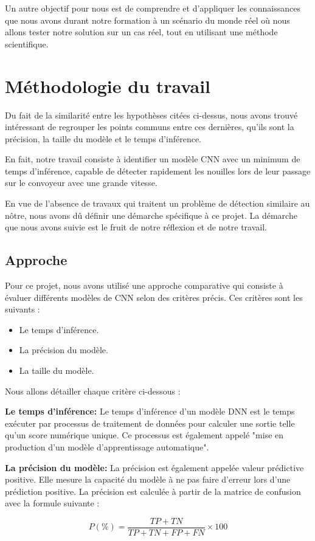 Un autre objectif pour nous est de comprendre et d'appliquer les connaissances que nous avons durant notre formation à un scénario du monde réel où nous allons tester notre solution sur un cas réel, tout en utilisant une méthode scientifique. 
\section{Méthodologie du travail}
Du fait de la similarité entre les hypothèses citées ci-dessus, nous avons trouvé intéressant de regrouper les points communs entre ces dernières, qu’ils sont la précision, la taille du modèle et le temps d’inférence. 

En fait, notre travail consiste à identifier un modèle CNN avec un minimum de temps d'inférence, capable de détecter rapidement les nouilles lors de leur passage sur le convoyeur avec une grande vitesse. 

En vue de l’absence de travaux qui traitent un problème de détection similaire au nôtre, nous avons dû définir une démarche spécifique à ce projet. La démarche que nous avons suivie est le fruit de notre réflexion et de notre travail. 
\subsection{Approche}
Pour ce projet, nous avons utilisé une approche comparative qui consiste à évaluer différents modèles de CNN selon des critères précis. Ces critères sont les suivants : 
\begin{itemize}
    \item Le temps d’inférence.
    \item La précision du modèle. 
    \item La taille du modèle. 
\end{itemize}
Nous allons détailler chaque critère ci-dessous : 

\textbf{Le temps d’inférence: }Le temps d'inférence d'un modèle DNN est le temps exécuter par processus de traitement de données pour calculer une sortie telle qu'un score numérique unique. Ce processus est également appelé "mise en production d'un modèle d'apprentissage automatique". 

\textbf{La précision du modèle: }La précision est également appelée valeur prédictive positive. Elle mesure la capacité du modèle à ne pas faire d'erreur lors d'une prédiction positive. La précision est calculée à partir de la matrice de confusion avec la formule suivante : 

\begin{equation}
    P(\%)=\frac{T P+T N}{T P+T N+F P+F N} \times 100
    \end{equation}

